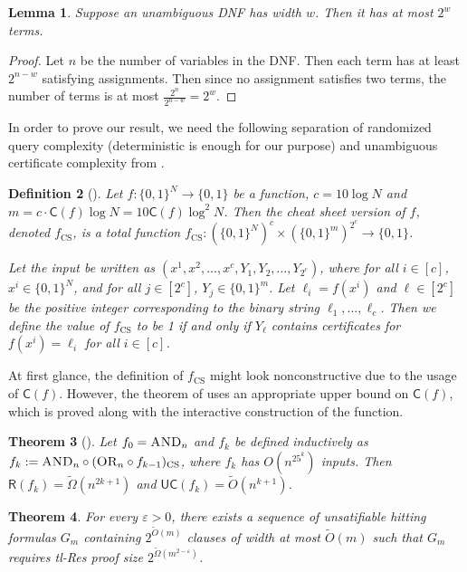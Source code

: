\documentclass[11pt]{article}
\newcommand{\scterm}[1]{{\textrm{\sc #1}}}
\newcommand{\tres}{\scterm{tl-Res}}
\newcommand{\AND}{{\scterm{AND}}}
\newcommand{\OR}{{\scterm{OR}}}
\newcommand{\fcs}{f_{\mathrm{CS}}}
\newcommand{\cert}{\mathsf{C}}
\newcommand{\ucert}{\mathsf{UC}}
\newcommand{\R}{\mathsf{R}}
\numberwithin{equation}{section}
\newtheorem{theorem}{Theorem}[section]
\newtheorem{lemma}[theorem]{Lemma}
\newtheorem{definition}[theorem]{Definition}
\begin{document}
\begin{lemma}\label{lem:unambiguous-width2size}
Suppose an unambiguous DNF has width $w$. Then it has at most $2^w$ terms.
\end{lemma}
\begin{proof}
  Let $n$ be the number of variables in the DNF. Then each term has at least $2^{n-w}$ satisfying assignments. Then since no assignment satisfies two terms, the number of terms is at most $\frac{2^n}{2^{n-w}} = 2^w$.
\end{proof}

In order to prove our result, we need the following 
separation of randomized query complexity (deterministic is enough for our purpose)
and unambiguous certificate complexity from \cite{AKK16}.

\begin{definition}[{\cite{ABK16,AKK16}}]
Let $f\colon\{0,1\}^N\to\{0,1\}$ be a function,
$c = 10 \log N$ and $m = c\cdot \cert(f) \log N = 10\cert(f)\log^2 N$.
Then the cheat sheet version of $f$, denoted
$\fcs$, is a total function
$\fcs\colon(\{0, 1\}^N )^ c \times (\{0, 1\}^m)^{2^c} \to\{0,1\}$.

Let the input be written as $(x^1,x^2,\dotsc,x^c,Y_1,Y_2,\dotsc,Y_{2^c})$,
where for all $i\in[c]$, $x^i\in\{0,1\}^N$, and for all $j\in[2^c]$,
$Y_j\in\{0,1\}^m$.
Let $\ell_i = f(x^i)$ and $\ell\in[2^c]$
be the positive integer corresponding to the binary string 
$\ell_1,\dotsc,\ell_c$.
Then we define the value of
$\fcs$
to be 1 if and only if $Y_\ell$ contains certificates for 
$f(x^i)=\ell_i$ 
for all $i\in[c]$.
\end{definition}

At first glance, the definition of $\fcs$ might look nonconstructive
due to the usage of $\cert(f)$. However, the theorem of \cite{AKK16} uses
an appropriate upper bound on $\cert(f)$, which is proved along
with the interactive construction of the function.

\begin{theorem}[{\cite[Theorem 5.1]{AKK16}}]\label{th:AKK16} 
Let $f_0 = \AND_n$ and $f_k$ be defined inductively as $f_k := \AND_n \circ (\OR_n \circ f_{k-1})_{\mathrm{CS}}$, where $f_k$ has $O(n^{25^k})$ inputs.
Then $\R(f_k) = \tilde\Omega(n^{2k+1})$ and $\ucert(f_k) = \tilde O(n^{k+1})$.
\end{theorem}

\begin{theorem}\label{th:tres-l-b} 
For every $\varepsilon>0$,
there exists a sequence of unsatifiable hitting formulas $G_m$ 
containing $2^{\tilde O(m)}$ clauses of width at most $\tilde O(m)$
such that 
$G_m$ requires {\tres} proof size $2^{\tilde\Omega(m^{2-\varepsilon})}$.
\end{theorem}
\end{document}

